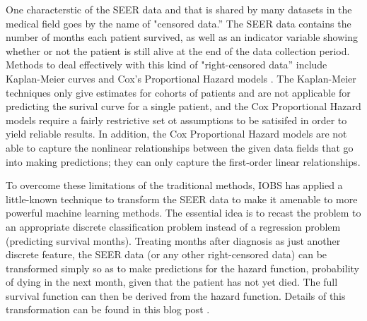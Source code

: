 \documentclass[a4paper,11pt]{article}
\begin{document}
One characterstic of the SEER data and that is shared by many datasets in the medical field 
goes by the name of "censored data.'' The SEER data contains the number of months each patient survived, as well as an indicator variable showing whether or not the patient is still alive at the end of the data collection period.
Methods to deal effectively with this kind of "right-censored data'' include Kaplan-Meier curves
and Cox's Proportional Hazard models \cite{cam}. The Kaplan-Meier techniques only give estimates for cohorts of patients and are not applicable for predicting the surival curve for a single patient, and the Cox Proportional Hazard models require a fairly restrictive set ot assumptions to be satisifed in order to yield reliable results. In addition, the Cox Proportional Hazard models are not able to capture the nonlinear relationships between the given data fields that go into making predictions; they can only capture the first-order linear relationships.


To overcome these limitations of the traditional methods, IOBS has applied a little-known technique to transform the SEER data to make it amenable to more powerful machine learning methods. The essential idea is to recast the problem to an appropriate discrete classification problem instead of a regression problem (predicting survival months). Treating months after diagnosis as just another discrete feature, the SEER data (or any other right-censored data) can be transformed simply so as to make predictions for the hazard function, 
 probability of dying in the next month, given that the patient has not yet died.
The full survival function can then be derived from the hazard function.
Details of this transformation can be found in this blog post \cite{kuhn}.




\end{document}
